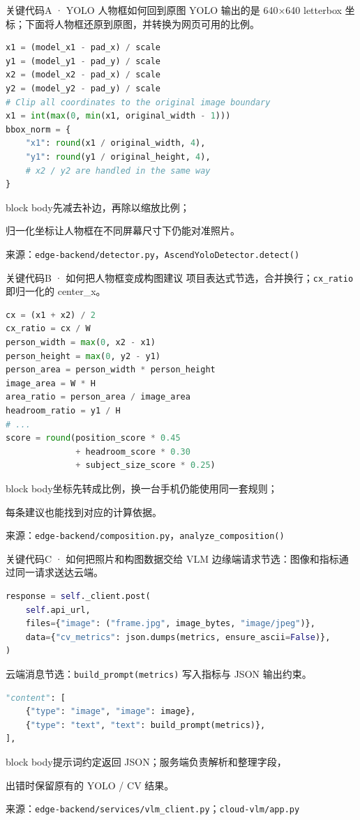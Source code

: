 \documentclass[aspectratio=169,11pt]{beamer}
\newcommand{\takeaway}[1]{\vspace{0.2cm}\begin{beamercolorbox}[sep=0.13cm,wd=\linewidth]{block body}\centering\small\color{accent}#1\end{beamercolorbox}}
\begin{document}
\begin{frame}[fragile]{关键代码}{A · YOLO 人物框如何回到原图}
\setlength{\parskip}{0pt}
\footnotesize YOLO 输出的是 640×640 letterbox 坐标；下面将人物框还原到原图，并转换为网页可用的比例。
\begin{lstlisting}[language=Python]
x1 = (model_x1 - pad_x) / scale
y1 = (model_y1 - pad_y) / scale
x2 = (model_x2 - pad_x) / scale
y2 = (model_y2 - pad_y) / scale
# Clip all coordinates to the original image boundary
x1 = int(max(0, min(x1, original_width - 1)))
bbox_norm = {
    "x1": round(x1 / original_width, 4),
    "y1": round(y1 / original_height, 4),
    # x2 / y2 are handled in the same way
}
\end{lstlisting}
\takeaway{先减去补边，再除以缩放比例；\par 归一化坐标让人物框在不同屏幕尺寸下仍能对准照片。}
\scriptsize\color{muted}来源：\texttt{edge-backend/detector.py}，\texttt{AscendYoloDetector.detect()}
\end{frame}

\begin{frame}[fragile]{关键代码}{B · 如何把人物框变成构图建议}
\setlength{\parskip}{0pt}
\small 项目表达式节选，合并换行；\texttt{cx\_ratio} 即归一化的 center\_x。
\begin{lstlisting}[language=Python]
cx = (x1 + x2) / 2
cx_ratio = cx / W
person_width = max(0, x2 - x1)
person_height = max(0, y2 - y1)
person_area = person_width * person_height
image_area = W * H
area_ratio = person_area / image_area
headroom_ratio = y1 / H
# ...
score = round(position_score * 0.45
              + headroom_score * 0.30
              + subject_size_score * 0.25)
\end{lstlisting}
\takeaway{坐标先转成比例，换一台手机仍能使用同一套规则；\par 每条建议也能找到对应的计算依据。}
\scriptsize\color{muted}来源：\texttt{edge-backend/composition.py}，\texttt{analyze\_composition()}
\end{frame}

\begin{frame}[fragile]{关键代码}{C · 如何把照片和构图数据交给 VLM}
\setlength{\parskip}{0pt}
\small 边缘端请求节选：图像和指标通过同一请求送达云端。
\begin{lstlisting}[language=Python]
response = self._client.post(
    self.api_url,
    files={"image": ("frame.jpg", image_bytes, "image/jpeg")},
    data={"cv_metrics": json.dumps(metrics, ensure_ascii=False)},
)
\end{lstlisting}
\small 云端消息节选：\texttt{build\_prompt(metrics)} 写入指标与 JSON 输出约束。
\begin{lstlisting}[language=Python]
"content": [
    {"type": "image", "image": image},
    {"type": "text", "text": build_prompt(metrics)},
],
\end{lstlisting}
\takeaway{提示词约定返回 JSON；服务端负责解析和整理字段，\par 出错时保留原有的 YOLO / CV 结果。}
\scriptsize\color{muted}来源：\texttt{edge-backend/services/vlm\_client.py}；\texttt{cloud-vlm/app.py}
\end{frame}
\end{document}
